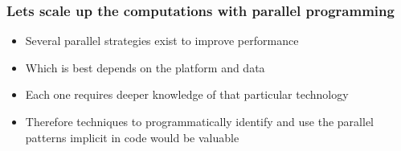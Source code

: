 \documentclass{beamer}
\begin{document}
\begin{frame}

    \frametitle{Lets scale up the computations with parallel programming}

    \begin{itemize}
        \item Several parallel strategies exist to improve performance
        \item Which is best depends on the platform and data
        \item Each one requires deeper knowledge of that particular technology
        \item Therefore techniques to programmatically identify and use the parallel
  patterns implicit in code would be valuable
    \end{itemize}

\end{frame}
\end{document}
